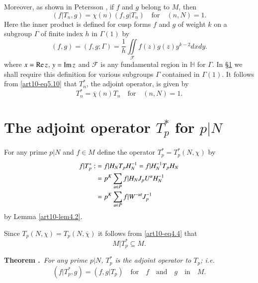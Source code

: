 Moreover, as shown in Petersson \cite{art10-key8}, if $f$ and $g$ belong to $M$, then
\begin{equation}
(f|T_{n},g)=\chi(n)(f,g|T_{n})\text{~~ for~~ } (n,N)=1.\label{art10-eq5.10}
\end{equation}
Here the inner product is defined for cusp forms $f$ and $g$ of weight $k$ on a subgroup $\Gamma$ of finite index $h$ in $\Gamma(1)$ by
\begin{equation}
(f,g)=(f,g;\Gamma)=\frac{1}{h}\iint\limits_{\mathscr{F}}f(z)g(z)y^{k-2}dxdy.\label{art10-eq5.11}
\end{equation}
where $x=\operatorname{Re} z$, $y=\operatorname{Im} z$ and $\mathscr{F}$ is any fundamental region in $\mathbb{H}$ for $\Gamma$. In \S\ref{art10-sec6} we shall require this definition for various subgroups $\Gamma$ contained in $\Gamma(1)$. It follows from \eqref{art10-eq5.10} that $T^{*}_{n}$, the adjoint operator, is given by 
\begin{equation}
T^{*}_{n}=\overline{\chi}(n)T_{n}\text{~~ for~~ } (n,N)=1.\label{art10-eq5.12}
\end{equation}

\section{The adjoint operator \texorpdfstring{$T^{*}_{p}$}{Tp} for \texorpdfstring{$p|N$}{pN}}\label{art10-sec6}
For any prime $p|N$ and $f\in M$ define the operator $T^{*}_{p}=T^{*}_{p}(N,\chi)$ by
\setcounter{equation}{0}
\begin{align}
f|T^{*}_{p}: &= f|H_{N}T_{p}H_{N}^{-1}=f|H_{N}^{-1}T_{p}H_{N}\label{art10-eq6.1}\\
            &= p^{K}\sum\limits_{u\in P}f|H_{N}J_{p}U^{u}H^{-1}_{N}\notag\\
            &= p^{K}\sum\limits_{u\in P}f|W^{-ut}J^{-1}_{p}\label{art10-eq6.2}
\end{align}
by Lemma \ref{art10-lem4.2}.

Since $T_{p}(N,\chi)=T_{p}(N,\overline{\chi})$ it follows from \eqref{art10-eq4.4} that
\begin{equation}
M|T^{*}_{p}\subseteq M.\label{art10-eq6.3}
\end{equation}

\medskip
\noindent
{\bf Theorem .\label{art10-thm6.1}}~{\em For any prime $p|N$, $T^{*}_{p}$ is the adjoint operator to $T_{p}$; i.e.}
\begin{equation}
(f|T^{*}_{p},g)=(f,g|T_{p})\text{~~ for~~ } f\text{~~ and~~ } g\text{~~ in~~ }M.\label{art10-eq6.4}
\end{equation}

